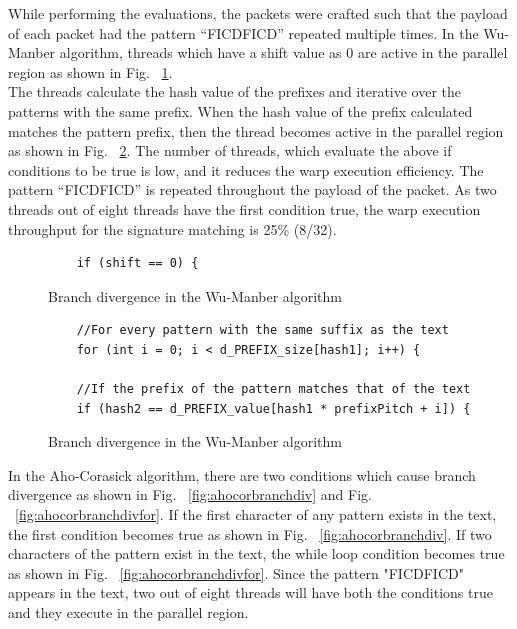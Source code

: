 While performing the evaluations, the packets were crafted such that the payload of each packet had the pattern “FICDFICD” repeated multiple times. In the Wu-Manber algorithm, threads which have a shift value as 0 are active in the parallel region as shown in Fig. ~\ref{fig:wumanbranchdiv}.\\ The threads calculate the hash value of the prefixes and iterative over the patterns with the same prefix. When the hash value of the prefix calculated matches the pattern prefix, then the thread becomes active in the parallel region as shown in Fig. ~\ref{fig:wumanbranchdivfor}. The number of threads, which evaluate the above if conditions to be true is low, and it reduces the warp execution efficiency. The pattern “FICDFICD” is repeated throughout the payload of the packet. As two threads out of eight threads have the first condition true, the warp execution throughput for the signature matching is 25\% (8/32).

\begin{figure}[H]
	\centering
	\begin{lstlisting}
	if (shift == 0) {
	\end{lstlisting}
	\caption{Branch divergence in the Wu-Manber algorithm}
	\label{fig:wumanbranchdiv}
\end{figure}
\squeezeup
\begin{figure}[H]
	\centering
	\begin{lstlisting}
	//For every pattern with the same suffix as the text
	for (int i = 0; i < d_PREFIX_size[hash1]; i++) {
	
	//If the prefix of the pattern matches that of the text
	if (hash2 == d_PREFIX_value[hash1 * prefixPitch + i]) {
	\end{lstlisting}
	\caption{Branch divergence in the Wu-Manber algorithm}
	\label{fig:wumanbranchdivfor}
\end{figure}
\squeezeup

In the Aho-Corasick algorithm, there are two conditions which cause branch divergence as shown in Fig. ~\ref{fig:ahocorbranchdiv} and Fig. ~\ref{fig:ahocorbranchdivfor}. If the first character of any pattern exists in the text, the first condition becomes true as shown in Fig. ~\ref{fig:ahocorbranchdiv}. If two characters of the pattern exist in the text, the while loop condition becomes true as shown in Fig. ~\ref{fig:ahocorbranchdivfor}. Since the pattern "FICDFICD" appears in the text, two out of eight threads will have both the conditions true and they execute in the parallel region.

